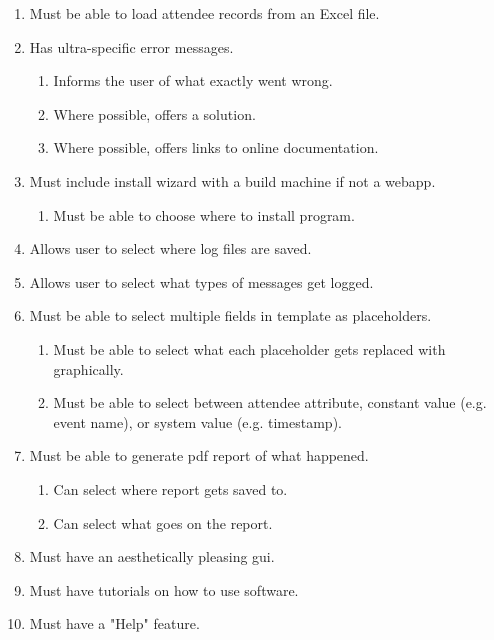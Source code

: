 \documentclass[11pt]{article}
\begin{document}
\begin{enumerate}
    \item Must be able to load attendee records from an Excel file.
    \item Has ultra-specific error messages.
    \begin{enumerate}
        \item Informs the \gls{user} of what exactly went wrong.
        \item Where possible, offers a solution.
        \item Where possible, offers links to online documentation.
    \end{enumerate}
    \item Must include install wizard with a build machine if not a \gls{webapp}.
    \begin{enumerate}
        \item Must be able to choose where to install program.
    \end{enumerate}
    \item Allows \gls{user} to select where log files are saved.
    \item Allows \gls{user} to select what types of messages get logged.
    \item Must be able to select multiple fields in template as placeholders.
    \begin{enumerate}
        \item Must be able to select what each placeholder gets replaced with graphically.
        \item Must be able to select between attendee attribute, constant value (e.g. event name), or system value (e.g. timestamp).
    \end{enumerate}
    \item Must be able to generate \acrshort{pdf} report of what happened.
    \begin{enumerate}
        \item Can select where report gets saved to.
        \item Can select what goes on the report.
    \end{enumerate}
    \item Must have an aesthetically pleasing \acrshort{gui}.
    \item Must have tutorials on how to use software.
    \item Must have a "Help" feature.
\end{enumerate}

\newpage
\end{document}

